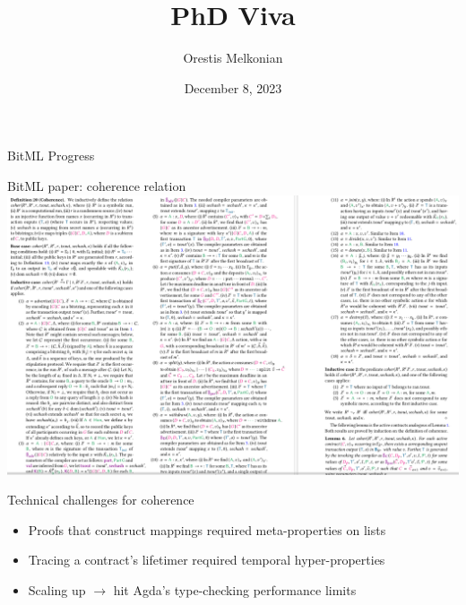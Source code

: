 \documentclass[aspectratio=169]{beamer}
\title{PhD Viva}
\author{Orestis Melkonian}
\date{December 8, 2023}
\renewcommand\alert[1]{\textcolor{mLightBrown}{#1}}
\begin{document}
\begin{center}
\maketitle
{}
\end{center}



\begin{frame}{BitML Progress}
\vspace{-1cm}
\begin{center}
\end{center}
\end{frame}

\begin{frame}{BitML paper: coherence relation}
\includegraphics[keepaspectratio=true,height=\textheight]{bitml-coherence}
\end{frame}

\begin{frame}{Technical challenges for coherence}
\begin{itemize}
\item Proofs that construct mappings required \alert{meta-properties} on lists
\item Tracing a contract's lifetimer required \alert{temporal hyper-properties}
\item Scaling up $\to$ hit Agda's \alert{type-checking performance} limits
\end{itemize}
\end{frame}
\end{document}
